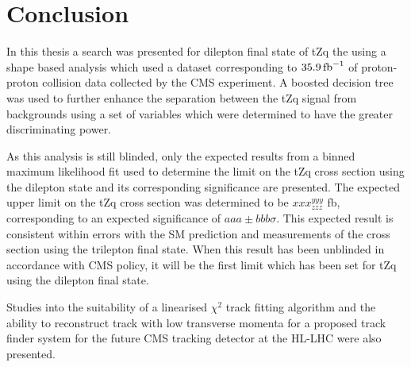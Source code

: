 \chapter{Conclusion}\label{chapter:conclusion}
In this thesis a search was presented for dilepton final state of tZq the using a shape based analysis which used a dataset corresponding to $35.9\mbox{\ensuremath{\,\text{fb}^\text{$-$1}}}$ of proton-proton collision data collected by the CMS experiment.
A boosted decision tree was used to further enhance the separation between the tZq signal from backgrounds using a set of variables which were determined to have the greater discriminating power.

As this analysis is still blinded, only the expected results from a binned maximum likelihood fit used to determine the limit on the tZq cross section using the dilepton state and its corresponding significance are presented.
The expected upper limit on the tZq cross section was determined to be $xxx^{yyy}_{zzz}$ fb, corresponding to an expected significance of $aaa \pm bbb \sigma$.
This expected result is consistent within errors with the SM prediction and measurements of the cross section using the trilepton final state.
When this result has been unblinded in accordance with CMS policy, it will be the first limit which has been set for tZq using the dilepton final state.

%
%


Studies into the suitability of a linearised $\chi^{2}$ track fitting algorithm and the ability to reconstruct track with low transverse momenta for a proposed track finder system for the future CMS tracking detector at the HL-LHC were also presented.

